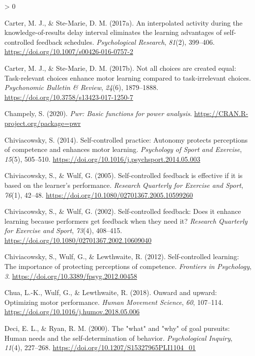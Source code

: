 \documentclass[
  english,
  jou]{apa7}
\newlength{\cslhangindent}
\newenvironment{CSLReferences}[2] %
 {%
  \setlength{\parindent}{0pt}
  \ifodd #1 \everypar{\setlength{\hangindent}{\cslhangindent}}\ignorespaces\fi
  \ifnum #2 > 0
  \setlength{\parskip}{#2\baselineskip}
  \fi
 }%
 {}
\begin{document}
\begin{CSLReferences}{1}{0}
\leavevmode\hypertarget{ref-carter2017b}{}%
Carter, M. J., \& Ste-Marie, D. M. (2017a). An interpolated activity during the knowledge-of-results delay interval eliminates the learning advantages of self-controlled feedback schedules. \emph{Psychological Research}, \emph{81}(2), 399--406. \url{https://doi.org/10.1007/s00426-016-0757-2}

\leavevmode\hypertarget{ref-carter2017a}{}%
Carter, M. J., \& Ste-Marie, D. M. (2017b). Not all choices are created equal: Task-relevant choices enhance motor learning compared to task-irrelevant choices. \emph{Psychonomic Bulletin \& Review}, \emph{24}(6), 1879--1888. \url{https://doi.org/10.3758/s13423-017-1250-7}

\leavevmode\hypertarget{ref-R-pwr}{}%
Champely, S. (2020). \emph{Pwr: Basic functions for power analysis}. \url{https://CRAN.R-project.org/package=pwr}

\leavevmode\hypertarget{ref-chiviacowsky2014}{}%
Chiviacowsky, S. (2014). Self-controlled practice: Autonomy protects perceptions of competence and enhances motor learning. \emph{Psychology of Sport and Exercise}, \emph{15}(5), 505--510. \url{https://doi.org/10.1016/j.psychsport.2014.05.003}

\leavevmode\hypertarget{ref-chiviacowsky2005}{}%
Chiviacowsky, S., \& Wulf, G. (2005). Self-controlled feedback is effective if it is based on the learner's performance. \emph{Research Quarterly for Exercise and Sport}, \emph{76}(1), 42--48. \url{https://doi.org/10.1080/02701367.2005.10599260}

\leavevmode\hypertarget{ref-chiviacowsky2002}{}%
Chiviacowsky, S., \& Wulf, G. (2002). Self-controlled feedback: Does it enhance learning because performers get feedback when they need it? \emph{Research Quarterly for Exercise and Sport}, \emph{73}(4), 408--415. \url{https://doi.org/10.1080/02701367.2002.10609040}

\leavevmode\hypertarget{ref-chiviacowsky2012}{}%
Chiviacowsky, S., Wulf, G., \& Lewthwaite, R. (2012). Self-controlled learning: The importance of protecting perceptions of competence. \emph{Frontiers in Psychology}, \emph{3}. \url{https://doi.org/10.3389/fpsyg.2012.00458}

\leavevmode\hypertarget{ref-chua2018}{}%
Chua, L.-K., Wulf, G., \& Lewthwaite, R. (2018). Onward and upward: Optimizing motor performance. \emph{Human Movement Science}, \emph{60}, 107--114. \url{https://doi.org/10.1016/j.humov.2018.05.006}

\leavevmode\hypertarget{ref-deci2000}{}%
Deci, E. L., \& Ryan, R. M. (2000). The {"}what{"} and {"}why{"} of goal pursuits: Human needs and the self-determination of behavior. \emph{Psychological Inquiry}, \emph{11}(4), 227--268. \url{https://doi.org/10.1207/S15327965PLI1104_01}


\end{CSLReferences}
\end{document}
